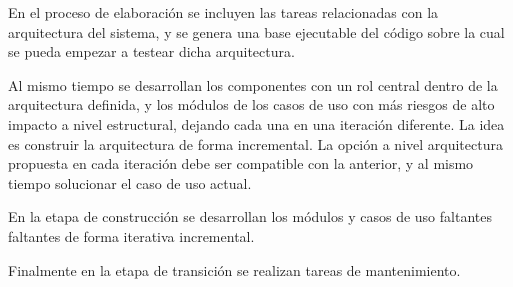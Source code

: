 En el proceso de elaboración se incluyen las tareas relacionadas con la arquitectura del sistema, y se genera una base ejecutable del código sobre la cual se pueda 
empezar a testear dicha arquitectura.

Al mismo tiempo se desarrollan los componentes con un rol central dentro de la arquitectura definida, y los módulos de los casos de uso con más riesgos
de alto impacto a nivel estructural, dejando cada una en una iteración diferente. La idea es construir la arquitectura de forma incremental. La opción a nivel arquitectura propuesta
en cada iteración debe ser compatible con la anterior, y al mismo tiempo solucionar el caso de uso actual.

En la etapa de construcción se desarrollan los módulos y casos de uso faltantes faltantes de forma iterativa incremental. 

Finalmente en la etapa de transición se realizan tareas de mantenimiento.
